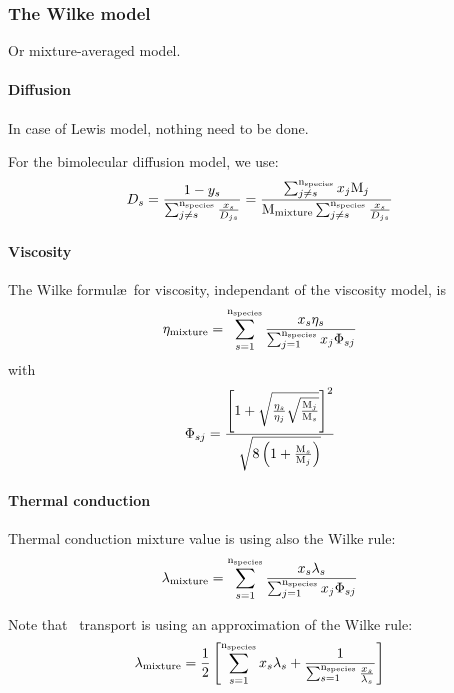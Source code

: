 \subsubsection{The Wilke model}
Or mixture-averaged model.

\paragraph{Diffusion}
In case of Lewis model, nothing need to be done.

For the bimolecular diffusion model, we use:
\begin{equation}
\diff[s] = \frac{1-\massfrac[s]}{\sum_{j\ne s}^{\nspecies}\frac{\molarfrac[s]}{\diff[js]}}
         = \frac{\sum_{j\neq s}^{\nspecies}\molarfrac[j]\Mm[j]}{\Mm[\text{mixture}]\sum_{j\ne s}^{\nspecies}\frac{\molarfrac[s]}{\diff[js]}}
\label{Wilke:diff}
\end{equation}

\paragraph{Viscosity} The Wilke formul\ae\ for viscosity, independant of
the viscosity model, is
\begin{equation}
\vis[\text{mixture}] = \sum_{s=1}^{\nspecies} \frac{\molarfrac[s]\vis[s]}{\sum_{j=1}^{\nspecies}\molarfrac[j]\Phi_{sj}}
\label{Wilke:viscosity}
\end{equation}
with
\begin{equation}
\Phi_{sj} = \frac{
                \left[
                     1 + \sqrt{\frac{\vis[s]}{\vis[j]}\sqrt{\frac{\Mm[j]}{\Mm[s]}}}
                \right]^2
                }{\sqrt{8\left(1 + \frac{\Mm[s]}{\Mm[j]}\right)}}
\label{Wilke:viscosity:Phi}
\end{equation}

\paragraph{Thermal conduction}
Thermal conduction mixture value is using also the Wilke rule:
\begin{equation}
\thermcond[\text{mixture}] = \sum_{s=1}^{\nspecies} \frac{\molarfrac[s]\thermcond[s]}{\sum_{j=1}^{\nspecies}\molarfrac[j]\Phi_{sj}}
\label{Wilke:therm_cond}
\end{equation}

Note that \ChemKin\ transport is using an approximation of
the Wilke rule:
\begin{equation}
\thermcond[\text{mixture}] = \frac{1}{2} \left[
                                                \sum_{s=1}^{\nspecies} \molarfrac[s]\thermcond[s] + 
                                                \frac{1}{\sum_{s=1}^{\nspecies} \frac{\molarfrac[s]}{\thermcond[s]}}
                                        \right]
\label{ChemKin:therm_cond}
\end{equation}
